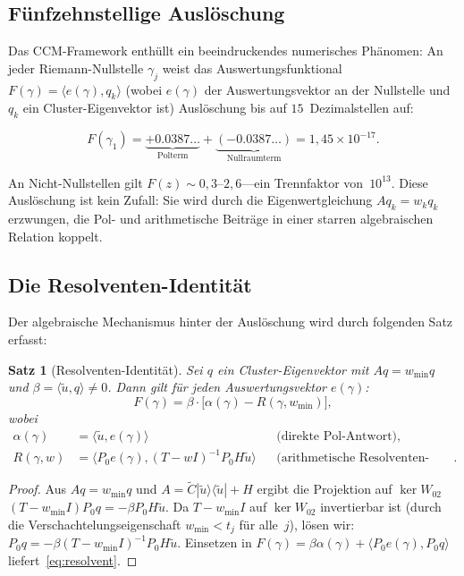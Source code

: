 \documentclass[12pt,a4paper]{article}
\newtheorem{theorem}{Satz}[section]
\theoremstyle{definition}
\theoremstyle{remark}
\newcommand{\ip}[2]{\langle #1, #2 \rangle}
\newcommand{\utilde}{\tilde{u}}
\newcommand{\Ctilde}{\tilde{C}}
\newcommand{\wmin}{w_{\min}}
\begin{document}
\subsection{Fünfzehnstellige Auslöschung}

Das CCM-Framework enthüllt ein beeindruckendes numerisches Phänomen:
An jeder Riemann-Nullstelle $\gamma_j$ weist das Auswertungsfunktional $F(\gamma)
= \ip{e(\gamma)}{q_k}$ (wobei $e(\gamma)$ der Auswertungsvektor an der
Nullstelle und $q_k$ ein Cluster-Eigenvektor ist) Auslöschung bis auf
$15$~Dezimalstellen auf:

\begin{equation}
\label{eq:cancel}
F(\gamma_1) = \underbrace{+0.0387\ldots}_{\text{Polterm}}
+ \underbrace{(-0.0387\ldots)}_{\text{Nullraumterm}}
= 1{,}45 \times 10^{-17}.
\end{equation}

An Nicht-Nullstellen gilt $F(z) \sim 0{,}3$--$2{,}6$---ein Trennfaktor von~$10^{13}$.
Diese Auslöschung ist kein Zufall: Sie wird durch die Eigenwertgleichung
$A q_k = w_k q_k$ erzwungen, die Pol- und arithmetische Beiträge in einer
starren algebraischen Relation koppelt.

\subsection{Die Resolventen-Identität}

Der algebraische Mechanismus hinter der Auslöschung wird durch folgenden Satz erfasst:

\begin{theorem}[Resolventen-Identität]
\label{thm:resolvent}
Sei $q$ ein Cluster-Eigenvektor mit $A q = \wmin q$ und $\beta = \ip{\utilde}{q} \neq 0$.
Dann gilt für jeden Auswertungsvektor $e(\gamma)$:
\begin{equation}
\label{eq:resolvent}
F(\gamma) = \beta \cdot \bigl[\alpha(\gamma) - R(\gamma, \wmin)\bigr],
\end{equation}
wobei
\begin{align}
\alpha(\gamma) &= \ip{\utilde}{e(\gamma)}
  && \text{(direkte Pol-Antwort)}, \\
R(\gamma, w) &= \ip{P_0 e(\gamma)}{(T - w I)^{-1} P_0 H \utilde}
  && \text{(arithmetische Resolventen-Antwort)}.
\end{align}
\end{theorem}

\begin{proof}
Aus $A q = \wmin q$ und $A = \Ctilde |\utilde\rangle\langle\utilde| + H$
ergibt die Projektion auf $\ker W_{02}$
$(T - \wmin I) P_0 q = -\beta P_0 H \utilde$.
Da $T - \wmin I$ auf $\ker W_{02}$ invertierbar ist
(durch die Verschachtelungseigenschaft $\wmin < t_j$ für alle~$j$), lösen wir:
$P_0 q = -\beta (T - \wmin I)^{-1} P_0 H \utilde$.
Einsetzen in $F(\gamma) = \beta \alpha(\gamma) + \ip{P_0 e(\gamma)}{P_0 q}$
liefert~\eqref{eq:resolvent}.
\end{proof}
\end{document}
